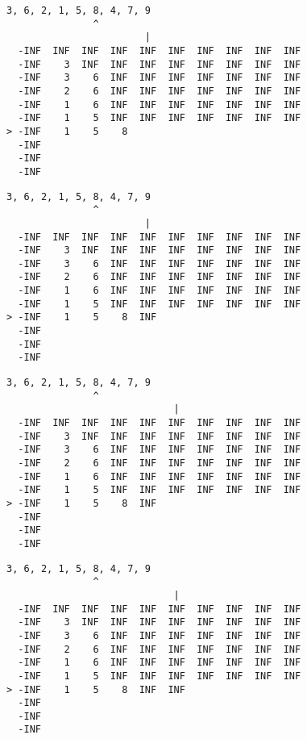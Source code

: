 { \begin{verbatim}
3, 6, 2, 1, 5, 8, 4, 7, 9
               ^
                        |
  -INF  INF  INF  INF  INF  INF  INF  INF  INF  INF
  -INF    3  INF  INF  INF  INF  INF  INF  INF  INF
  -INF    3    6  INF  INF  INF  INF  INF  INF  INF
  -INF    2    6  INF  INF  INF  INF  INF  INF  INF
  -INF    1    6  INF  INF  INF  INF  INF  INF  INF
  -INF    1    5  INF  INF  INF  INF  INF  INF  INF
> -INF    1    5    8                              
  -INF                                             
  -INF                                             
  -INF                                             
\end{verbatim} }

{ \begin{verbatim}
3, 6, 2, 1, 5, 8, 4, 7, 9
               ^
                        |
  -INF  INF  INF  INF  INF  INF  INF  INF  INF  INF
  -INF    3  INF  INF  INF  INF  INF  INF  INF  INF
  -INF    3    6  INF  INF  INF  INF  INF  INF  INF
  -INF    2    6  INF  INF  INF  INF  INF  INF  INF
  -INF    1    6  INF  INF  INF  INF  INF  INF  INF
  -INF    1    5  INF  INF  INF  INF  INF  INF  INF
> -INF    1    5    8  INF                         
  -INF                                             
  -INF                                             
  -INF                                             
\end{verbatim} }

{ \begin{verbatim}
3, 6, 2, 1, 5, 8, 4, 7, 9
               ^
                             |
  -INF  INF  INF  INF  INF  INF  INF  INF  INF  INF
  -INF    3  INF  INF  INF  INF  INF  INF  INF  INF
  -INF    3    6  INF  INF  INF  INF  INF  INF  INF
  -INF    2    6  INF  INF  INF  INF  INF  INF  INF
  -INF    1    6  INF  INF  INF  INF  INF  INF  INF
  -INF    1    5  INF  INF  INF  INF  INF  INF  INF
> -INF    1    5    8  INF                         
  -INF                                             
  -INF                                             
  -INF                                             
\end{verbatim} }

{ \begin{verbatim}
3, 6, 2, 1, 5, 8, 4, 7, 9
               ^
                             |
  -INF  INF  INF  INF  INF  INF  INF  INF  INF  INF
  -INF    3  INF  INF  INF  INF  INF  INF  INF  INF
  -INF    3    6  INF  INF  INF  INF  INF  INF  INF
  -INF    2    6  INF  INF  INF  INF  INF  INF  INF
  -INF    1    6  INF  INF  INF  INF  INF  INF  INF
  -INF    1    5  INF  INF  INF  INF  INF  INF  INF
> -INF    1    5    8  INF  INF                    
  -INF                                             
  -INF                                             
  -INF                                             
\end{verbatim} }

